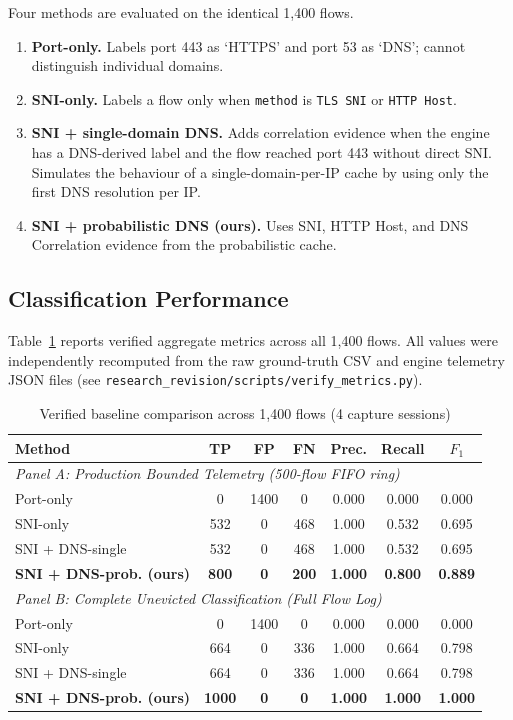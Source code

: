 \documentclass[conference]{IEEEtran}
\begin{document}
Four methods are evaluated on the identical 1,400 flows.
\begin{enumerate}
\item \textbf{Port-only.} Labels port 443 as `HTTPS' and port 53
as `DNS'; cannot distinguish individual domains.
\item \textbf{SNI-only.} Labels a flow only when \texttt{method} is
\texttt{TLS SNI} or \texttt{HTTP Host}.
\item \textbf{SNI + single-domain DNS.} Adds correlation evidence
when the engine has a DNS-derived label and the flow reached port 443
without direct SNI.  Simulates the behaviour of a single-domain-per-IP
cache by using only the first DNS resolution per IP.
\item \textbf{SNI + probabilistic DNS (ours).} Uses SNI, HTTP Host,
and DNS Correlation evidence from the probabilistic cache.
\end{enumerate}

\subsection{Classification Performance}

Table~\ref{tab:baseline} reports verified aggregate metrics across
all 1,400 flows. All values were independently recomputed from the
raw ground-truth CSV and engine telemetry JSON files
(see \texttt{research\_revision/scripts/verify\_metrics.py}).

\begin{table}[!t]
\centering
\caption{Verified baseline comparison across 1,400 flows (4 capture sessions)}
\label{tab:baseline}
\scriptsize
\setlength{\tabcolsep}{2.5pt}
\begin{tabular}{|l|c|c|c|c|c|c|}
\hline
\textbf{Method} & \textbf{TP} & \textbf{FP} & \textbf{FN} & \textbf{Prec.} & \textbf{Recall} & \textbf{$F_1$} \\
\hline
\multicolumn{7}{|l|}{\textit{Panel A: Production Bounded Telemetry (500-flow FIFO ring)}} \\
\hline
Port-only & 0 & 1400 & 0 & 0.000 & 0.000 & 0.000 \\
\hline
SNI-only & 532 & 0 & 468 & 1.000 & 0.532 & 0.695 \\
\hline
SNI + DNS-single & 532 & 0 & 468 & 1.000 & 0.532 & 0.695 \\
\hline
\textbf{SNI + DNS-prob. (ours)} & \textbf{800} & \textbf{0} & \textbf{200} & \textbf{1.000} & \textbf{0.800} & \textbf{0.889} \\
\hline
\multicolumn{7}{|l|}{\textit{Panel B: Complete Unevicted Classification (Full Flow Log)}} \\
\hline
Port-only & 0 & 1400 & 0 & 0.000 & 0.000 & 0.000 \\
\hline
SNI-only & 664 & 0 & 336 & 1.000 & 0.664 & 0.798 \\
\hline
SNI + DNS-single & 664 & 0 & 336 & 1.000 & 0.664 & 0.798 \\
\hline
\textbf{SNI + DNS-prob. (ours)} & \textbf{1000} & \textbf{0} & \textbf{0} & \textbf{1.000} & \textbf{1.000} & \textbf{1.000} \\
\hline
\end{tabular}
\end{table}
\end{document}
